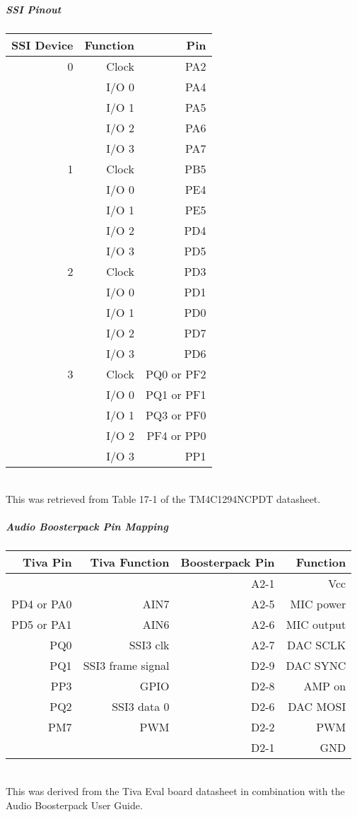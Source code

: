 \documentclass{article}
\begin{document}
\subparagraph{SSI Pinout}
\begin{center}
    \begin{tabular}{| r | r | r |}
        \hline
        SSI Device & Function & Pin \\ 
        \hline
        0 & Clock & PA2 \\
        & I/O 0 & PA4 \\
        & I/O 1 & PA5 \\
        & I/O 2 & PA6 \\
        & I/O 3 & PA7 \\
        \hline
        1 & Clock & PB5 \\
        & I/O 0 & PE4 \\
        & I/O 1 & PE5 \\
        & I/O 2 & PD4 \\
        & I/O 3 & PD5 \\
        \hline
        2 & Clock & PD3 \\
        & I/O 0 & PD1 \\
        & I/O 1 & PD0 \\
        & I/O 2 & PD7 \\
        & I/O 3 & PD6 \\
        \hline
        3 & Clock & PQ0 or PF2 \\
        & I/O 0 & PQ1 or PF1 \\
        & I/O 1 & PQ3 or PF0 \\
        & I/O 2 & PF4 or PP0 \\
        & I/O 3 & PP1\\
        \hline
    \end{tabular}\\
This was retrieved from Table 17-1 of the TM4C1294NCPDT datasheet.
\end{center}

\subparagraph{Audio Boosterpack Pin Mapping}
\begin{center}
    \begin{tabular}{| r | r | r | r |}
        \hline
        Tiva Pin & Tiva Function & Boosterpack Pin & Function \\
        \hline
        & & A2-1 & Vcc \\
        PD4 or PA0 & AIN7 & A2-5 & MIC power \\
        PD5 or PA1 & AIN6 & A2-6 & MIC output \\
        PQ0 & SSI3 clk & A2-7 & DAC SCLK \\
        PQ1 & SSI3 frame signal & D2-9 & DAC SYNC \\
        PP3 & GPIO & D2-8 & AMP on \\
        PQ2 & SSI3 data 0 & D2-6 & DAC MOSI \\
        PM7 & PWM & D2-2 & PWM \\
            & & D2-1 & GND \\
        \hline
    \end{tabular}\\
This was derived from the Tiva Eval board datasheet in combination with the Audio Boosterpack User Guide.
\end{center}
\end{document}

